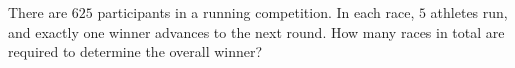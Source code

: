 There are $625$ participants in a running competition. In each race, $5$ athletes run, and exactly one winner advances to the next round. How many races in total are required to determine the overall winner?
